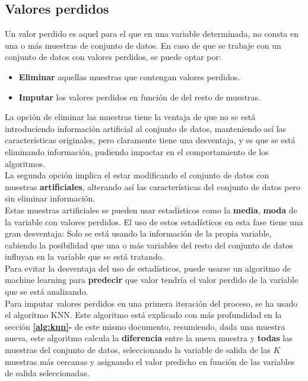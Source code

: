 \subsection{Valores perdidos}
Un valor perdido es aquel para el que en una variable determinada, no consta en una o más muestras de conjunto de datos. En caso de que se trabaje con un conjunto de datos con valores perdidos, se puede optar por:
\begin{itemize}
	\item \textbf{Eliminar} aquellas muestras que contengan valores perdidos.
	\item \textbf{Imputar} los valores perdidos en función de del resto de muestras.
\end{itemize}

La opción de eliminar las muestras tiene la ventaja de que no se está introduciendo información artificial al conjunto de datos, manteniendo así las características originales, pero claramente tiene una desventaja, y es que se está eliminando información, pudiendo impactar en el comportamiento de los algoritmos.\\
\linebreak
La segunda opción implica el estar modificando el conjunto de datos con muestras \textbf{artificiales}, alterando así las características del conjunto de datos pero sin eliminar información.\\
Estas muestras artificiales se pueden usar estadísticos como la \textbf{media}, \textbf{moda} de la variable con valores perdidos. El uso de estos estadísticos en esta fase tiene una gran desventaja: Solo se está usando la información de la propia variable, cabiendo la posibilidad que una o más variables del resto del conjunto de datos influyan en la variable que se está tratando. \\
\linebreak
Para evitar la desventaja del uso de estadísticos, puede usarse un algoritmo de machine learning para \textbf{predecir} que valor tendría el valor perdido de la variable que se está analizando. \\
\linebreak
Para imputar valores perdidos en una primera iteración del proceso, se ha usado el algoritmo KNN. Este algoritmo está explicado con más profundidad en la sección \textbf{\ref{alg:knn}-} de este mismo documento, resumiendo, dada una muestra nueva,  este algoritmo calcula la \textbf{diferencia} entre la nueva muestra y \textbf{todas} las muestras del conjunto de datos, seleccionando la variable de salida de las $K$ muestras más cercanas y asignando el valor predicho en función de las variables de salida seleccionadas.
